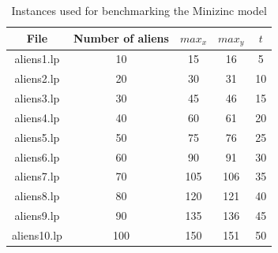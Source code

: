 \documentclass[11pt]{article}
\begin{document}
\begin{table}[h]
  \centering
  \begin{tabular}{|c|c|c|c|c|}
    \hline
    File & Number of aliens & $max_x$ & $max_y$ & $t$ \\
    \hline
    aliens1.lp & 10 & 15 & 16 & 5 \\
    aliens2.lp & 20 & 30 & 31 & 10 \\
    aliens3.lp & 30 & 45 & 46 & 15 \\
    aliens4.lp & 40 & 60 & 61 & 20 \\
    aliens5.lp & 50 & 75 & 76 & 25 \\
    aliens6.lp & 60 & 90 & 91 & 30 \\
    aliens7.lp & 70 & 105 & 106 & 35 \\
    aliens8.lp & 80 & 120 & 121 & 40 \\
    aliens9.lp & 90 & 135 & 136 & 45 \\
    aliens10.lp & 100 & 150 & 151 & 50 \\
    \hline
  \end{tabular}
  \caption{Instances used for benchmarking the Minizinc model}
  \label{table:minizinc-bench-instances}
\end{table}
\end{document}
